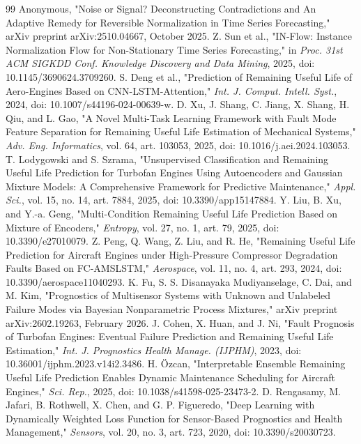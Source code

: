\documentclass[review,12pt]{elsarticle}
\begin{document}
\begin{thebibliography}{99}
  Anonymous, "Noise or Signal? Deconstructing Contradictions and An Adaptive Remedy for Reversible Normalization in Time Series Forecasting," arXiv preprint arXiv:2510.04667, October 2025.
  Z. Sun et al., "IN-Flow: Instance Normalization Flow for Non-Stationary Time Series Forecasting," in \textit{Proc. 31st ACM SIGKDD Conf. Knowledge Discovery and Data Mining}, 2025, doi: 10.1145/3690624.3709260.
  S. Deng et al., "Prediction of Remaining Useful Life of Aero-Engines Based on CNN-LSTM-Attention," \textit{Int. J. Comput. Intell. Syst.}, 2024, doi: 10.1007/s44196-024-00639-w.
  D. Xu, J. Shang, C. Jiang, X. Shang, H. Qiu, and L. Gao, "A Novel Multi-Task Learning Framework with Fault Mode Feature Separation for Remaining Useful Life Estimation of Mechanical Systems," \textit{Adv. Eng. Informatics}, vol. 64, art. 103053, 2025, doi: 10.1016/j.aei.2024.103053.
  T. Lodygowski and S. Szrama, "Unsupervised Classification and Remaining Useful Life Prediction for Turbofan Engines Using Autoencoders and Gaussian Mixture Models: A Comprehensive Framework for Predictive Maintenance," \textit{Appl. Sci.}, vol. 15, no. 14, art. 7884, 2025, doi: 10.3390/app15147884.
  Y. Liu, B. Xu, and Y.-a. Geng, "Multi-Condition Remaining Useful Life Prediction Based on Mixture of Encoders," \textit{Entropy}, vol. 27, no. 1, art. 79, 2025, doi: 10.3390/e27010079.
  Z. Peng, Q. Wang, Z. Liu, and R. He, "Remaining Useful Life Prediction for Aircraft Engines under High-Pressure Compressor Degradation Faults Based on FC-AMSLSTM," \textit{Aerospace}, vol. 11, no. 4, art. 293, 2024, doi: 10.3390/aerospace11040293.
  K. Fu, S. S. Disanayaka Mudiyanselage, C. Dai, and M. Kim, "Prognostics of Multisensor Systems with Unknown and Unlabeled Failure Modes via Bayesian Nonparametric Process Mixtures," arXiv preprint arXiv:2602.19263, February 2026.
  J. Cohen, X. Huan, and J. Ni, "Fault Prognosis of Turbofan Engines: Eventual Failure Prediction and Remaining Useful Life Estimation," \textit{Int. J. Prognostics Health Manage. (IJPHM)}, 2023, doi: 10.36001/ijphm.2023.v14i2.3486.
  H. \"{O}zcan, "Interpretable Ensemble Remaining Useful Life Prediction Enables Dynamic Maintenance Scheduling for Aircraft Engines," \textit{Sci. Rep.}, 2025, doi: 10.1038/s41598-025-23473-2.
  D. Rengasamy, M. Jafari, B. Rothwell, X. Chen, and G. P. Figueredo, "Deep Learning with Dynamically Weighted Loss Function for Sensor-Based Prognostics and Health Management," \textit{Sensors}, vol. 20, no. 3, art. 723, 2020, doi: 10.3390/s20030723.

\end{thebibliography}
\end{document}
